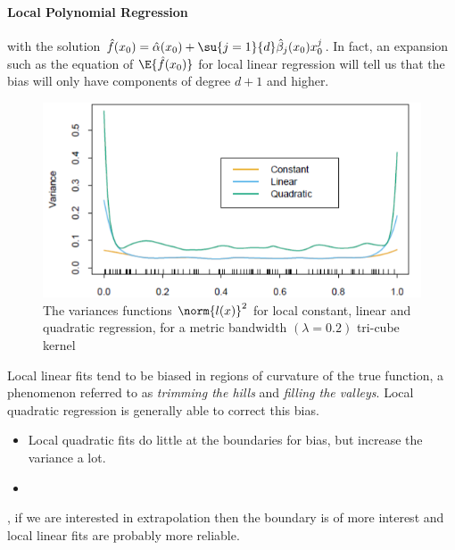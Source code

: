 \paragraph{Local Polynomial Regression}
\begin{center}
\end{center}
with the solution $\hat{f}(x_{0})=\hat{\alpha}(x_{0})+\su{{j=1}}{d}\hat{\beta}_{j}(x_{0})x_{0}^{j}$.
In fact, an expansion such as the equation of $\E{\hat{f}(x_{0})}$ for local linear regression 
will tell us that the bias will only have components of degree $d+1$ and higher.
\begin{figure}[H]
	\begin{center}
		\includegraphics[width=.7\textwidth]{./chap/1chap/3sec/8images/5_linearPoly.PNG}
	\end{center}
	\caption{The variances functions $\norm{l(x)}^{2}$ for local constant, linear and quadratic
	regression, for a metric bandwidth $(\lambda=0.2)$ tri-cube kernel}
	\label{fig:5_linearPol}
\end{figure}
Local linear fits tend to be biased in regions of curvature of the true function, a phenomenon
referred to as \emph{trimming the hills} and \emph{filling the valleys}. Local quadratic regression
is generally able to correct this bias.
\begin{itemize}
	\item {} Local quadratic fits do little at the boundaries for bias, but 
		increase the variance a lot.
	\item {}
\end{itemize}
, if
we are interested in extrapolation then the boundary is of more interest and local linear fits 
are probably more reliable.

